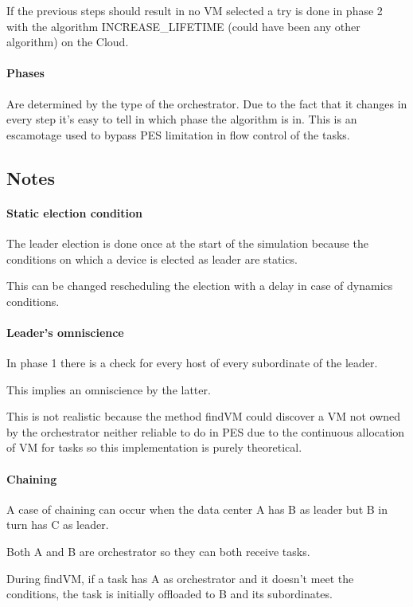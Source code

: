 \documentclass[12pt]{report}
\begin{document}
If the previous steps should result in no VM selected a try is done in phase 2 with the algorithm INCREASE\_LIFETIME (could have been any other algorithm) on the Cloud.\\

\paragraph{Phases}
Are determined by the type of the orchestrator.
Due to the fact that it changes in every step it's easy to tell in which phase the algorithm is in.
This is an escamotage used to bypass PES limitation in flow control of the tasks.\\

\subsection{Notes}

\paragraph{Static election condition} The leader election is done once at the start of the simulation because the conditions on which a device is elected as leader are statics.

This can be changed rescheduling the election with a delay in case of dynamics conditions.

\paragraph{Leader's omniscience}
In phase 1 there is a check for every host of every subordinate of the leader.

This implies an omniscience by the latter.

This is not realistic because the method findVM could discover a VM not owned by the orchestrator neither reliable to do in PES due to the continuous allocation of VM for tasks so this implementation is purely theoretical.

\paragraph{Chaining}
A case of chaining can occur when the data center A has B as leader but B in turn has C as leader.

Both A and B are orchestrator so they can both receive tasks.

During findVM, if a task has A as orchestrator and it doesn't meet the conditions, the task is initially offloaded to B and its subordinates.
\end{document}
